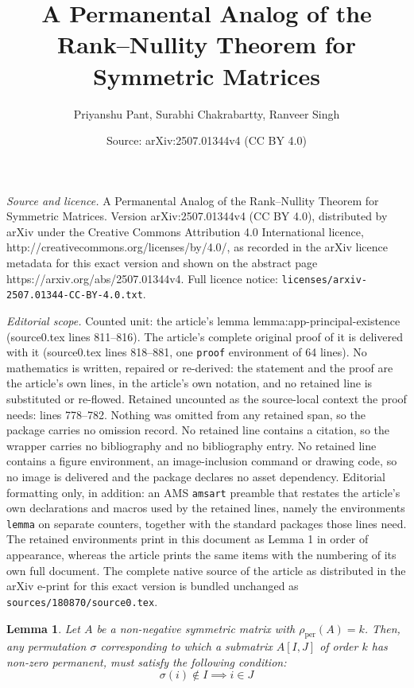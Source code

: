 \documentclass[10pt,a4paper]{amsart}
\title{A Permanental Analog of the Rank--Nullity Theorem for Symmetric Matrices}
\author{Priyanshu Pant, Surabhi Chakrabartty, Ranveer Singh}
\date{Source: arXiv:2507.01344v4 (CC BY 4.0)}
\newtheorem{lemma}{Lemma}
\DeclareMathOperator{\per}{per}
\begin{document}
\maketitle

\noindent\emph{Source and licence.} A Permanental Analog of the Rank--Nullity Theorem for Symmetric Matrices. Version arXiv:2507.01344v4 (CC BY 4.0), distributed by arXiv under the Creative Commons Attribution 4.0 International licence, http://creativecommons.org/licenses/by/4.0/, as recorded in the arXiv licence metadata for this exact version and shown on the abstract page https://arxiv.org/abs/2507.01344v4. Full licence notice: \texttt{licenses/arxiv-2507.01344-CC-BY-4.0.txt}.\par\smallskip

\noindent\textit{Editorial scope.} Counted unit: the article's lemma lemma:app-principal-existence (source0.tex lines 811--816). The article's complete original proof of it is delivered with it (source0.tex lines 818--881, one \texttt{proof} environment of 64 lines). No mathematics is written, repaired or re-derived: the statement and the proof are the article's own lines, in the article's own notation, and no retained line is substituted or re-flowed.  Retained uncounted as the source-local context the proof needs: lines 778--782.  Nothing was omitted from any retained span, so the package carries no omission record.  No retained line contains a citation, so the wrapper carries no bibliography and no bibliography entry.  No retained line contains a figure environment, an image-inclusion command or drawing code, so no image is delivered and the package declares no asset dependency.  Editorial formatting only, in addition: an AMS \texttt{amsart} preamble that restates the article's own declarations and macros used by the retained lines, namely the environments \texttt{lemma} on separate counters, together with the standard packages those lines need.  The retained environments print in this document as Lemma 1 in order of appearance, whereas the article prints the same items with the numbering of its own full document.  The complete native source of the article as distributed in the arXiv e-print for this exact version is bundled unchanged as \texttt{sources/180870/source0.tex}.
\begin{lemma}\label{lemma:app-bijection-constraint}
  Let \( A \) be a non-negative symmetric matrix with \( \rho_{\per}(A) = k \). 
  Then, any permutation $\sigma$ corresponding to which a submatrix $A[I, J]$ of order $k$ has non-zero permanent, must satisfy the following condition:
    \[ \sigma(i) \notin I \implies i \in J\]
\end{lemma}
\end{document}
